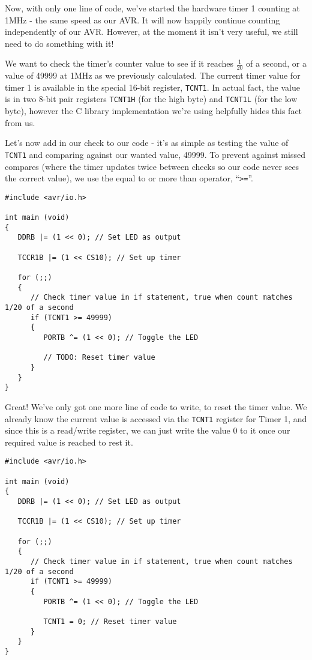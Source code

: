 \documentclass[a4paper,oneside,notitlepage]{book}
\begin{document}
Now, with only one line of code, we've started the hardware timer 1 counting at 1MHz - the same speed as our AVR. It will now happily continue counting independently of our AVR. However, at the moment it isn't very useful, we still need to do something with it!

We want to check the timer's counter value to see if it reaches \(\frac{1}{20}\) of a second, or a value of 49999 at 1MHz as we previously calculated. The current timer value for timer 1 is available in the special 16-bit register, \texttt{TCNT1}. In actual fact, the value is in two 8-bit pair registers \texttt{TCNT1H} (for the high byte) and \texttt{TCNT1L} (for the low byte), however the C library implementation we're using helpfully hides this fact from us.

Let's now add in our check to our code - it's as simple as testing the value of \texttt{TCNT1} and comparing against our wanted value, 49999. To prevent against missed compares (where the timer updates twice between checks so our code never sees the correct value), we use the equal to or more than operator, ``\texttt{>=}''.

\begin{center}
\begin{lstlisting}
#include <avr/io.h>

int main (void)
{
   DDRB |= (1 << 0); // Set LED as output

   TCCR1B |= (1 << CS10); // Set up timer

   for (;;)
   {
      // Check timer value in if statement, true when count matches 1/20 of a second
      if (TCNT1 >= 49999)
      {
         PORTB ^= (1 << 0); // Toggle the LED

         // TODO: Reset timer value
      }
   }
} 
\end{lstlisting}
\end{center}

Great! We've only got one more line of code to write, to reset the timer value. We already know the current value is accessed via the \texttt{TCNT1} register for Timer 1, and since this is a read/write register, we can just write the value 0 to it once our required value is reached to rest it.

\begin{center}
\begin{lstlisting}
#include <avr/io.h>

int main (void)
{
   DDRB |= (1 << 0); // Set LED as output

   TCCR1B |= (1 << CS10); // Set up timer

   for (;;)
   {
      // Check timer value in if statement, true when count matches 1/20 of a second
      if (TCNT1 >= 49999)
      {
         PORTB ^= (1 << 0); // Toggle the LED

         TCNT1 = 0; // Reset timer value
      }
   }
} 
\end{lstlisting}
\end{center}
\end{document}
